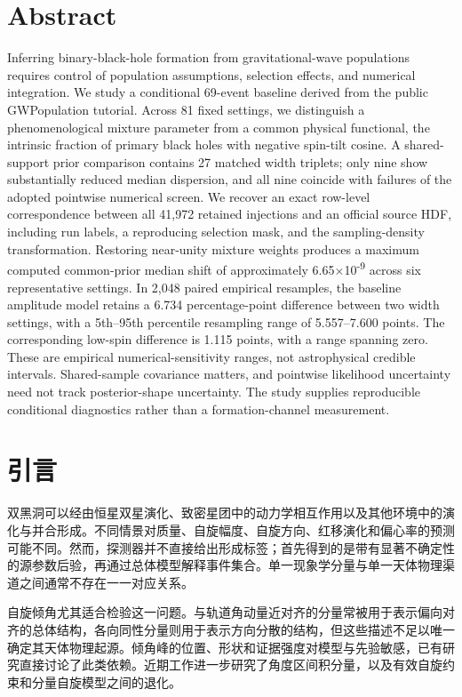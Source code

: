 \documentclass[UTF8,a4paper,11pt,fontset=fandol]{ctexart}
\begin{document}
\section*{Abstract}
Inferring binary-black-hole formation from gravitational-wave populations requires control of population assumptions, selection effects, and numerical integration. We study a conditional 69-event baseline derived from the public GWPopulation tutorial. Across 81 fixed settings, we distinguish a phenomenological mixture parameter from a common physical functional, the intrinsic fraction of primary black holes with negative spin-tilt cosine. A shared-support prior comparison contains 27 matched width triplets; only nine show substantially reduced median dispersion, and all nine coincide with failures of the adopted pointwise numerical screen. We recover an exact row-level correspondence between all 41,972 retained injections and an official source HDF, including run labels, a reproducing selection mask, and the sampling-density transformation. Restoring near-unity mixture weights produces a maximum computed common-prior median shift of approximately 6.65\(\times\)10\textsuperscript{-9} across six representative settings. In 2,048 paired empirical resamples, the baseline amplitude model retains a 6.734 percentage-point difference between two width settings, with a 5th–95th percentile resampling range of 5.557–7.600 points. The corresponding low-spin difference is 1.115 points, with a range spanning zero. These are empirical numerical-sensitivity ranges, not astrophysical credible intervals. Shared-sample covariance matters, and pointwise likelihood uncertainty need not track posterior-shape uncertainty. The study supplies reproducible conditional diagnostics rather than a formation-channel measurement.
\FloatBarrier
\section{引言}\label{sec:1}
双黑洞可以经由恒星双星演化、致密星团中的动力学相互作用以及其他环境中的演化与并合形成。不同情景对质量、自旋幅度、自旋方向、红移演化和偏心率的预测可能不同。然而，探测器并不直接给出形成标签；首先得到的是带有显著不确定性的源参数后验，再通过总体模型解释事件集合。单一现象学分量与单一天体物理渠道之间通常不存在一一对应关系\cite{ref1}。

自旋倾角尤其适合检验这一问题。与轨道角动量近对齐的分量常被用于表示偏向对齐的总体结构，各向同性分量则用于表示方向分散的结构，但这些描述不足以唯一确定其天体物理起源。倾角峰的位置、形状和证据强度对模型与先验敏感，已有研究直接讨论了此类依赖\cite{ref2}。近期工作进一步研究了角度区间积分量，以及有效自旋约束和分量自旋模型之间的退化\cite{ref5,ref6}。
\end{document}
